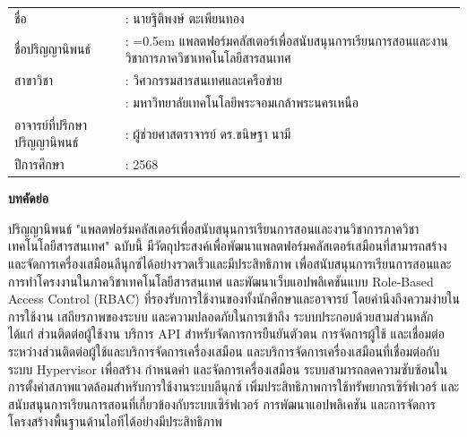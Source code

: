 {}
\vspace*{-0.5in}

\begin{tabularx}{\textwidth}{lX}
ชื่อ                           & : นายฐิติพงษ์ ตะเพียนทอง         %
\\
ชื่อปริญญานิพนธ์                  & : \hangindent=0.5em          %
                                แพลตฟอร์มคลัสเตอร์เพื่อสนับสนุนการเรียนการสอนและงานวิชาการภาควิชาเทคโนโลยีสารสนเทศ  %
\\
สาขาวิชา                       & : วิศวกรรมสารสนเทศและเครือข่าย %
\\
                             & : มหาวิทยาลัยเทคโนโลยีพระจอมเกล้าพระนครเหนือ
\\
อาจารย์ที่ปรึกษาปริญญานิพนธ์        & : ผู้ช่วยศาสตราจารย์ ดร.ขนิษฐา นามี    %
\\
ปีการศึกษา                     & : 2568     %
\end{tabularx}

\vspace{5mm}
\begin{center}\textbf{บทคัดย่อ}\end{center}
\hspace*{1.5em} %
ปริญญานิพนธ์ "แพลตฟอร์มคลัสเตอร์เพื่อสนับสนุนการเรียนการสอนและงานวิชาการภาควิชาเทคโนโลยีสารสนเทศ" ฉบับนี้ มีวัตถุประสงค์เพื่อพัฒนาแพลตฟอร์มคลัสเตอร์เสมือนที่สามารถสร้างและจัดการเครื่องเสมือนลีนุกซ์ได้อย่างรวดเร็วและมีประสิทธิภาพ เพื่อสนับสนุนการเรียนการสอนและการทำโครงงานในภาควิชาเทคโนโลยีสารสนเทศ และพัฒนาเว็บแอปพลิเคชันแบบ Role-Based Access Control (RBAC) ที่รองรับการใช้งานของทั้งนักศึกษาและอาจารย์ โดยคำนึงถึงความง่ายในการใช้งาน เสถียรภาพของระบบ และความปลอดภัยในการเข้าถึง ระบบประกอบด้วยสามส่วนหลัก ได้แก่ ส่วนติดต่อผู้ใช้งาน บริการ API สำหรับจัดการการยืนยันตัวตน การจัดการผู้ใช้ และเชื่อมต่อระหว่างส่วนติดต่อผู้ใช้และบริการจัดการเครื่องเสมือน และบริการจัดการเครื่องเสมือนที่เชื่อมต่อกับระบบ Hypervisor เพื่อสร้าง กำหนดค่า และจัดการเครื่องเสมือน ระบบสามารถลดความซับซ้อนในการตั้งค่าสภาพแวดล้อมสำหรับการใช้งานระบบลีนุกซ์ เพิ่มประสิทธิภาพการใช้ทรัพยากรเซิร์ฟเวอร์ และสนับสนุนการเรียนการสอนที่เกี่ยวข้องกับระบบเซิร์ฟเวอร์ การพัฒนาแอปพลิเคชัน และการจัดการโครงสร้างพื้นฐานด้านไอทีได้อย่างมีประสิทธิภาพ

